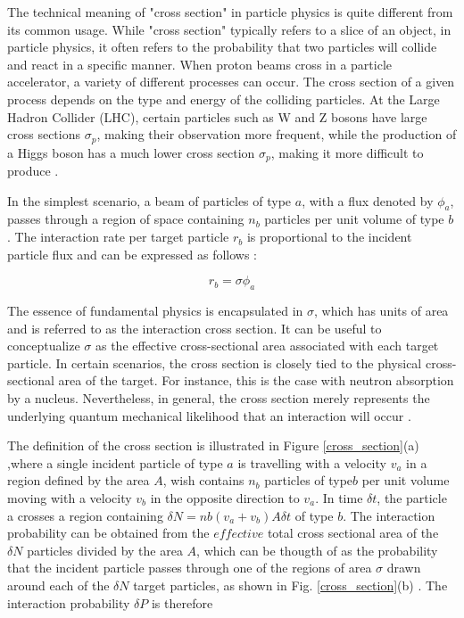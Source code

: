 The technical meaning of "cross section" in particle physics is quite different from its common usage. While "cross section" typically refers to a slice of an object, in particle physics, it often refers to the probability that two particles will collide and react in a specific manner. When proton beams cross in a particle accelerator, a variety of different processes can occur. The cross section of a given process depends on the type and energy of the colliding particles.
At the Large Hadron Collider (LHC), certain particles such as W and Z bosons have large cross sections $\sigma_{p}$, making their observation more frequent, while the production of a Higgs boson has a much lower cross section $\sigma_{p}$, making it more difficult to produce \cite{thomson_2013}.

In the simplest scenario, a beam of particles of type $a$, with a flux denoted by $\phi_{a}$, passes through a region of space containing $n_{b}$ particles per unit volume of type $b$. The interaction rate per target particle $r_{b}$ is proportional to the incident particle flux and can be expressed as follows \cite{thomson_2013}:

\begin{equation*}
  r_{b}=\sigma \phi_{a}
\end{equation*}

The essence of fundamental physics is encapsulated in $\sigma$, which has units of area and is referred to as the interaction cross section. It can be useful to conceptualize $\sigma$ as the effective cross-sectional area associated with each target particle. In certain scenarios, the cross section is closely tied to the physical cross-sectional area of the target. For instance, this is the case with neutron absorption by a nucleus. Nevertheless, in general, the cross section merely represents the underlying quantum mechanical likelihood that an interaction will occur \cite{thomson_2013}.

The definition of the cross section is illustrated in Figure \ref{cross_section}(a) ,where a single incident particle of type $a$ is travelling with a velocity $v_{a}$ in a region defined by the area $A$, wish contains $n_{b}$ particles of type$ b$ per unit volume moving with a velocity $v_{b}$ in the opposite direction to $v_{a}$.
In  time $\delta t$, the particle a crosses a region containing $\delta N= nb(v_{a}+v_{b}) A \delta t$ of type $b$. The interaction probability can be obtained from the $effective$ total cross sectional area of the $\delta N$ particles divided by the area $A$, which can be thougth of as the probability that the incident particle passes through one of the regions of area $\sigma$ drawn around each of the $\delta N$ target particles, as shown in Fig. \ref{cross_section}(b) \cite{thomson_2013}. The interaction probability $\delta P$ is therefore

